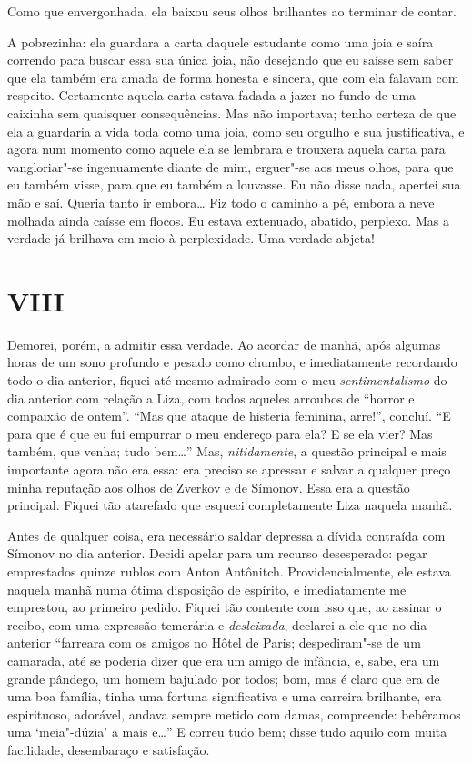 Como que envergonhada, ela baixou seus olhos brilhantes ao terminar de
contar.

A pobrezinha: ela guardara a carta daquele estudante como uma joia e
saíra correndo para buscar essa sua única joia, não desejando que eu
saísse sem saber que ela também era amada de forma honesta e sincera,
que com ela falavam com respeito. Certamente aquela carta estava fadada
a jazer no fundo de uma caixinha sem quaisquer consequências. Mas não
importava; tenho certeza de que ela a guardaria a vida toda como uma
joia, como seu orgulho e sua justificativa, e agora num momento como
aquele ela se lembrara e trouxera aquela carta para vangloriar"-se
ingenuamente diante de mim, erguer"-se aos meus olhos, para que eu
também visse, para que eu também a louvasse. Eu não disse nada, apertei
sua mão e saí. Queria tanto ir embora\ldots{} Fiz todo o caminho a pé,
embora a neve molhada ainda caísse em flocos. Eu estava extenuado,
abatido, perplexo. Mas a verdade já brilhava em meio à perplexidade.
Uma verdade abjeta!


\section{VIII}

Demorei, porém, a admitir essa verdade. Ao acordar de manhã, após
algumas horas de um sono profundo e pesado como chumbo, e imediatamente
recordando todo o dia anterior, fiquei até mesmo admirado com o meu
\textit{sentimentalismo} do dia anterior com relação a Liza, com todos
aqueles arroubos de “horror e compaixão de ontem”. “Mas que ataque de
histeria feminina, arre!”, concluí. “E para que é que eu fui empurrar o
meu endereço para ela? E se ela vier? Mas também, que venha; tudo
bem\ldots{}” Mas, \textit{nitidamente}, a questão principal e mais
importante agora não era essa: era preciso se apressar e salvar a
qualquer preço minha reputação aos olhos de Zverkov e de Símonov. Essa
era a questão principal. Fiquei tão atarefado que esqueci completamente
Liza naquela manhã.

Antes de qualquer coisa, era necessário saldar depressa a dívida
contraída com Símonov no dia anterior. Decidi apelar para um recurso
desesperado: pegar emprestados quinze rublos com Anton Antônitch.
Providencialmente, ele estava naquela manhã numa ótima disposição de
espírito, e imediatamente me emprestou, ao primeiro pedido. Fiquei tão
contente com isso que, ao assinar o recibo, com uma expressão temerária
e \textit{desleixada}, declarei a ele que no dia anterior “farreara com
os amigos no Hôtel de Paris; despediram"-se de um
camarada, até se poderia dizer que era um amigo de infância, e, sabe,
era um grande pândego, um homem bajulado por todos; bom, mas é claro
que era de uma boa família, tinha uma fortuna significativa e uma
carreira brilhante, era espirituoso, adorável, andava sempre metido com
damas, compreende: bebêramos uma ‘meia"-dúzia’ a mais e\ldots{}” E correu
tudo bem; disse tudo aquilo com muita facilidade, desembaraço e
satisfação.

